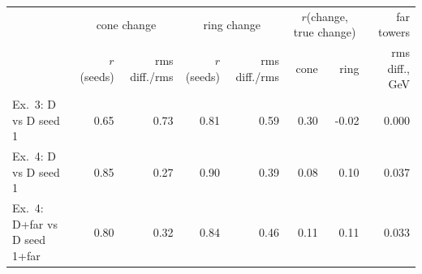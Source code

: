 \scriptsize
\setlength{\tabcolsep}{3pt}
\begin{tabular}{lrrrrrrr}
\toprule
 & \multicolumn{2}{c}{cone change} & \multicolumn{2}{c}{ring change} & \multicolumn{2}{c}{$r$(change, true change)} & far towers \\
 & $r$(seeds) & rms diff./rms & $r$(seeds) & rms diff./rms & cone & ring & rms diff., GeV \\
\midrule
Ex.~3: D vs D seed 1 & 0.65 & 0.73 & 0.81 & 0.59 & 0.30 & -0.02 & 0.000 \\
Ex.~4: D vs D seed 1 & 0.85 & 0.27 & 0.90 & 0.39 & 0.08 & 0.10 & 0.037 \\
Ex.~4: D+far vs D seed 1+far & 0.80 & 0.32 & 0.84 & 0.46 & 0.11 & 0.11 & 0.033 \\
\bottomrule
\end{tabular}
